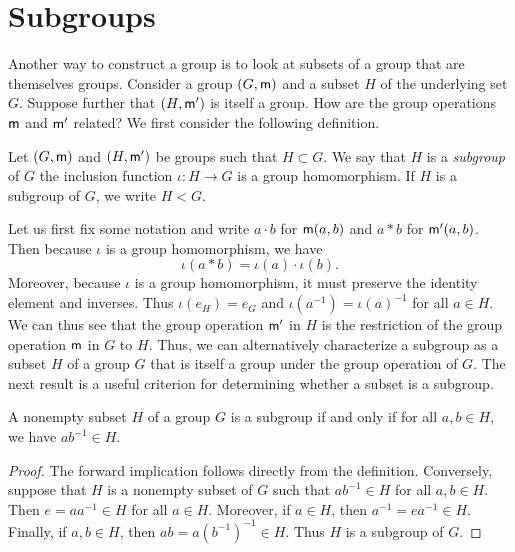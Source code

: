 \section{Subgroups}

\begin{remark}
    Another way to construct a group is to look at subsets of a group that are
    themselves groups. Consider a group \((G, {\mathsf{m}})\) and a subset \(H\) of
    the underlying set \(G\). Suppose further that \((H, {\mathsf{m}}')\) is itself a
    group. How are the group operations \({\mathsf{m}}\) and \({\mathsf{m}}'\) related? We
    first consider the following definition.
\end{remark}

\begin{definition}
    Let \((G, {\mathsf{m}})\) and \((H, {\mathsf{m}}')\) be groups such that \(H \subset G\).
    We say that \(H\) is a \emph{subgroup} of \(G\) the inclusion function
    \(\iota : H \to G\) is a group homomorphism. If \(H\) is a subgroup of
    \(G\), we write \(H < G\).
\end{definition}

\begin{remark}
    Let us first fix some notation and write \(a \cdot b\) for \({\mathsf{m}}(a,b)\)
    and \(a * b\) for \({\mathsf{m}}'(a,b)\). Then because \(\iota\) is a group
    homomorphism, we have
    \[
        \iota(a * b) = \iota(a) \cdot \iota(b).
    \]
    Moreover, because \(\iota\) is a group homomorphism, it must preserve the
    identity element and inverses. Thus \(\iota(e_H) = e_G\) and \(\iota(a^{-1})
    = \iota(a)^{-1}\) for all \(a \in H\). We can thus see that the group
    operation \({\mathsf{m}}'\) in \(H\) is the restriction of the group operation
    \({\mathsf{m}}\) in \(G\) to \(H\). Thus, we can alternatively characterize a
    subgroup as a subset \(H\) of a group \(G\) that is itself a group under the
    group operation of \(G\). The next result is a useful criterion for
    determining whether a subset is a subgroup.
\end{remark}

\begin{theorem}
    \label{thm:subgroup-test}
    A nonempty subset \(H\) of a group \(G\) is a subgroup if and only if for
    all \(a, b \in H\), we have \(ab^{-1} \in H\).
\end{theorem}

\begin{proof}
    The forward implication follows directly from the definition. Conversely,
    suppose that \(H\) is a nonempty subset of \(G\) such that \(ab^{-1} \in H\)
    for all \(a, b \in H\). Then \(e = aa^{-1} \in H\) for all \(a \in H\).
    Moreover, if \(a \in H\), then \(a^{-1} = ea^{-1} \in H\). Finally, if \(a,
    b \in H\), then \(ab = a(b^{-1})^{-1} \in H\). Thus \(H\) is a subgroup of
    \(G\).
\end{proof}

